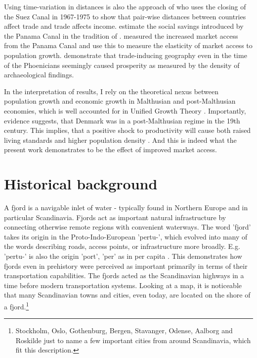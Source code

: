 \documentclass[11pt]{article}
\begin{document}
Using time-variation in distances is also the approach of \cite{Feyrer2021} who uses the closing of the Suez Canal in 1967-1975 to show that pair-wise distances between countries affect trade and trade affects income. \cite{Maurer2008} estimate the social savings introduced by the Panama Canal in the tradition of \cite{Fogel1964}. \cite{rauch2022a} measured the increased market access from the Panama Canal and use this to measure the elasticity of market access to population growth. \cite{Bakker2021Phonecians} demonstrate that trade-inducing geography even in the time of the Phoenicians seemingly caused prosperity as measured by the density of archaeological findings. 

In the interpretation of results, I rely on the theoretical nexus between population growth and economic growth in Malthusian and post-Malthusian economies, which is well accounted for in Unified Growth Theory \citep{Galor2005, Galor2011}. Importantly, evidence suggests, that Denmark was in a post-Malthusian regime in the 19th century. This implies, that a positive shock to productivity will cause both raised living standards and higher population density \citep{Jensen2022, Klemp2016}. And this is indeed what the present work demonstrates to be the effect of improved market access. 




\section{Historical background}
A fjord is a navigable inlet of water - typically found in Northern Europe and in particular Scandinavia. Fjords act as important natural infrastructure by connecting otherwise remote regions with convenient waterways. The word 'fjord' takes its origin in the Proto-Indo-European 'pertu-', which evolved into many of the words describing roads, access points, or infrastructure more broadly. E.g. 'pertu-' is also the origin 'port', 'per' as in per capita \citep{EtymFjord}. This demonstrates how fjords even in prehistory were perceived as important primarily in terms of their transportation capabilities. The fjords acted as the Scandinavian highways in a time before modern transportation systems. Looking at a map, it is noticeable that many Scandinavian towns and cities, even today, are located on the shore of a fjord.\footnote{Stockholm, Oslo, Gothenburg, Bergen, Stavanger, Odense, Aalborg and Roskilde just to name a few important cities from around Scandinavia, which fit this description.}
\end{document}
